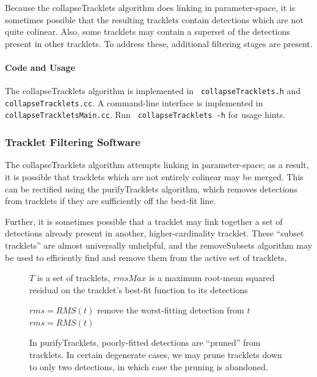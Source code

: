 Because the collapseTracklets algorithm does linking in
parameter-space, it is sometimes possible that the resulting tracklets
contain detections which are not quite colinear.  Also, some tracklets
may contain a superset of the detections present in other tracklets.
To address these, additional filtering stages are present.

\paragraph{Code and Usage}
The collapseTracklets algorithm is implemented in {\tt
  collapseTracklets.h} and {\tt collapseTracklets.cc}.  A command-line
interface is implemented in {\tt collapseTrackletsMain.cc}.  Run {\tt
  collapseTracklets -h} for usage hints.






\subsubsection{Tracklet Filtering Software}
The collapseTracklets algorithm attempts linking in parameter-space;
as a result, it is possible that tracklets which are not entirely
colinear may be merged.  This can be rectified using the
purifyTracklets algorithm, which removes detections from tracklets if
they are sufficiently off the best-fit line.  

Further, it is sometimes possible that a tracklet may link together a
set of detections already present in another, higher-cardinality
tracklet.  These ``subset tracklets'' are almost universally
unhelpful, and the removeSubsets algorithm may be used to efficiently
find and remove them from the active set of tracklets.


\begin{figure}[ht!]
\begin{algorithmic}
  \REQUIRE $T$ is a set of tracklets, $rmsMax$ is a maximum root-mean
  squared residual on the tracklet's best-fit function to its
  detections

    \STATE $rms = RMS(t)$
      \STATE remove the worst-fitting detection from $t$
      \STATE $rms = RMS(t)$
    \ENDWHILE
  \ENDFOR
\end{algorithmic}

\caption{In purifyTracklets, poorly-fitted detections are ``pruned''
  from tracklets. In certain degenerate cases, we may prune tracklets
  down to only two detections, in which case the pruning is
  abandoned.}

\label{purifyTrackletsAlgorithm}

\end{figure}


